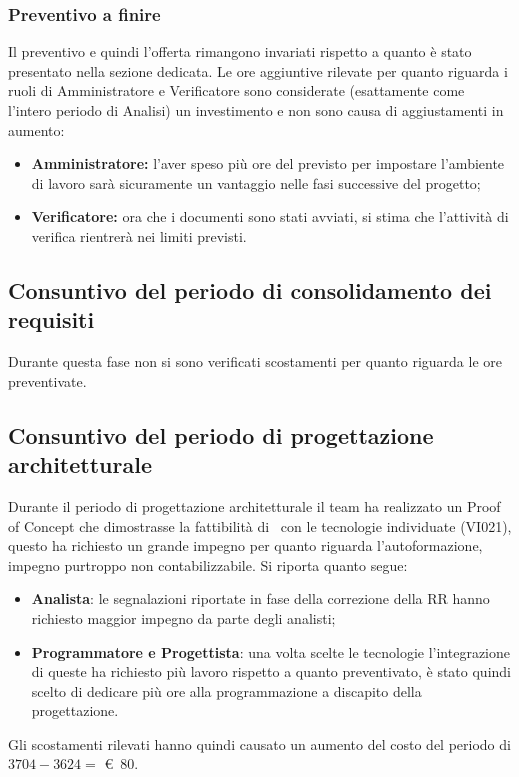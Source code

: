     \subsubsection{Preventivo a finire}
    Il preventivo e quindi l'offerta rimangono invariati rispetto a quanto è stato presentato nella sezione dedicata. Le ore aggiuntive rilevate per quanto riguarda i ruoli di Amministratore e Verificatore sono considerate (esattamente come l'intero periodo di Analisi) un investimento e non sono causa di aggiustamenti in aumento: 
    \begin{itemize}
        \item \textbf{Amministratore:} l'aver speso più ore del previsto per impostare l'ambiente di lavoro sarà sicuramente un vantaggio nelle fasi successive del progetto;
        \item \textbf{Verificatore:} ora che i documenti sono stati avviati, si stima che l'attività di verifica rientrerà nei limiti previsti.
    \end{itemize}

\subsection{Consuntivo del periodo di consolidamento dei requisiti}
    Durante questa fase non si sono verificati scostamenti per quanto riguarda le ore preventivate. 

\subsection{Consuntivo del periodo di progettazione architetturale}
    Durante il periodo di progettazione architetturale il team ha realizzato un Proof of Concept che dimostrasse la fattibilità di \hd\ con le tecnologie individuate (VI021), questo ha richiesto un grande impegno per quanto riguarda l'autoformazione, impegno purtroppo non contabilizzabile. 
    Si riporta quanto segue:
    \begin{itemize}
        \item \textbf{Analista}: le segnalazioni riportate in fase della correzione della RR hanno richiesto maggior impegno da parte degli analisti;
        \item \textbf{Programmatore e Progettista}: una volta scelte le tecnologie l'integrazione di queste ha richiesto più lavoro rispetto a quanto preventivato, è stato quindi scelto di dedicare più ore alla programmazione a discapito della progettazione.
    \end{itemize}
    \def\salarycontent{
        {Amministratore,13,20,260},
        {Analista,$26+\noexpand\textbf{6}$,25,800},
        {Progettista,$62-\noexpand\textbf{10}$,22,1144},
        {Programmatore,$31+\noexpand\textbf{10}$,15,615},
        {Responsabile,9,30,270},
        {Verificatore,41,15,615},
        {Totale,188,127,3704},
    }
    
    \noindent Gli scostamenti rilevati hanno quindi causato un aumento del costo del periodo di $3704 - 3624 =$ \euro\ 80.

